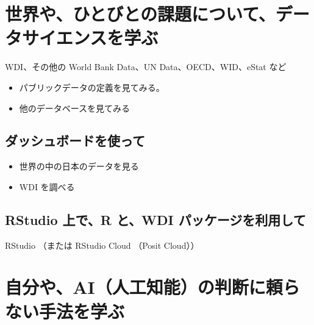 \documentclass[
]{book}
\providecommand{\tightlist}{%
  \setlength{\itemsep}{0pt}\setlength{\parskip}{0pt}}
\theoremstyle{definition}
\theoremstyle{definition}
\theoremstyle{definition}
\theoremstyle{definition}
\theoremstyle{remark}
\begin{document}
\hypertarget{ux4e16ux754cux3084ux3072ux3068ux3073ux3068ux306eux8ab2ux984cux306bux3064ux3044ux3066ux30c7ux30fcux30bfux30b5ux30a4ux30a8ux30f3ux30b9ux3092ux5b66ux3076-1}{%
\section{世界や、ひとびとの課題について、データサイエンスを学ぶ}\label{ux4e16ux754cux3084ux3072ux3068ux3073ux3068ux306eux8ab2ux984cux306bux3064ux3044ux3066ux30c7ux30fcux30bfux30b5ux30a4ux30a8ux30f3ux30b9ux3092ux5b66ux3076-1}}

WDI、その他の World Bank Data、UN Data、OECD、WID、eStat など

\begin{itemize}
\tightlist
\item
  パブリックデータの定義を見てみる。
\item
  他のデータベースを見てみる
\end{itemize}

\hypertarget{ux30c0ux30c3ux30b7ux30e5ux30dcux30fcux30c9ux3092ux4f7fux3063ux3066}{%
\subsection{ダッシュボードを使って}\label{ux30c0ux30c3ux30b7ux30e5ux30dcux30fcux30c9ux3092ux4f7fux3063ux3066}}

\begin{itemize}
\tightlist
\item
  世界の中の日本のデータを見る
\item
  WDI を調べる
\end{itemize}

\hypertarget{rstudio-ux4e0aux3067r-ux3068wdi-ux30d1ux30c3ux30b1ux30fcux30b8ux3092ux5229ux7528ux3057ux3066}{%
\subsection{RStudio 上で、R と、WDI パッケージを利用して}\label{rstudio-ux4e0aux3067r-ux3068wdi-ux30d1ux30c3ux30b1ux30fcux30b8ux3092ux5229ux7528ux3057ux3066}}

RStudio （または RStudio Cloud （Posit Cloud））

\hypertarget{ux81eaux5206ux3084aiux4ebaux5de5ux77e5ux80fdux306eux5224ux65adux306bux983cux3089ux306aux3044ux624bux6cd5ux3092ux5b66ux3076-1}{%
\section{自分や、AI（人工知能）の判断に頼らない手法を学ぶ}\label{ux81eaux5206ux3084aiux4ebaux5de5ux77e5ux80fdux306eux5224ux65adux306bux983cux3089ux306aux3044ux624bux6cd5ux3092ux5b66ux3076-1}}
\end{document}
